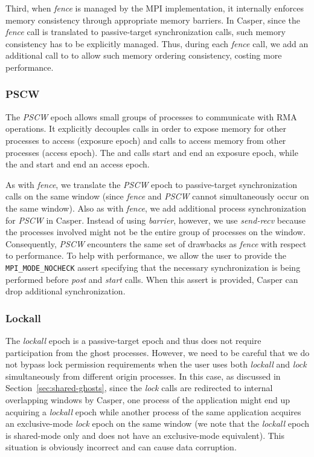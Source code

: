 Third, when \emph{fence} is managed by the MPI implementation, it
internally enforces memory consistency through appropriate memory
barriers.  In Casper, since the \emph{fence} call is translated to
passive-target synchronization calls, such memory consistency has to
be explicitly managed.  Thus, during each \emph{fence} call, we add
an additional call to  to allow such memory
ordering consistency, costing more performance.

\subsubsection{PSCW}  The \emph{PSCW} epoch allows small groups of
processes to communicate with RMA operations.  It explicitly decouples
calls in order to expose memory for other processes to access (exposure epoch)
and calls to access memory from other processes (access epoch).  The
 and  calls start and end an
exposure epoch, while the  and
 start and end an access epoch.

As with \emph{fence}, we translate the \emph{PSCW} epoch to
passive-target synchronization calls on the same window (since
\emph{fence} and \emph{PSCW} cannot simultaneously occur on the same
window).  Also as with \emph{fence}, we add additional process
synchronization for \emph{PSCW} in Casper. Instead of using
\emph{barrier}, however, we use \emph{send-recv} because the processes involved
might not be the entire group of processes on the window.
Consequently, \emph{PSCW} encounters the same set of drawbacks as
\emph{fence} with respect to performance.  To help with performance,
we allow the user to provide the \texttt{MPI\_MODE\_NOCHECK} assert
specifying that the necessary
synchronization is being performed before \emph{post} and \emph{start} calls.
When this assert is provided,
Casper can drop additional synchronization.

\subsubsection{Lockall}  The \emph{lockall} epoch is a passive-target
epoch and thus does not require participation from the ghost
processes.  However, we need to be careful that we do not
bypass lock permission requirements when the user uses both
\emph{lockall} and \emph{lock} simultaneously from different origin
processes.  In this case, as discussed in
Section~\ref{sec:shared-ghosts}, since the \emph{lock} calls are
redirected to internal overlapping windows by Casper,
one process of the application might end up acquiring a
\emph{lockall} epoch while another process of the same application
acquires an exclusive-mode \emph{lock} epoch on the same window (we
note that the \emph{lockall} epoch is shared-mode only and does not
have an exclusive-mode equivalent).  This situation is obviously incorrect and
can cause data corruption.

